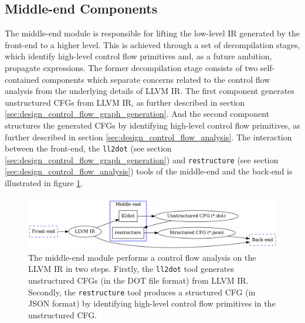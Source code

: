 


\subsection{Middle-end Components}
\label{sec:middle-end_components}

The middle-end module is responsible for lifting the low-level IR generated by the front-end to a higher level. This is achieved through a set of decompilation stages, which identify high-level control flow primitives and, as a future ambition, propagate expressions. The former decompilation stage consists of two self-contained components which separate concerns related to the control flow analysis from the underlying details of LLVM IR. The first component generates unstructured CFGs from LLVM IR, as further described in section \ref{sec:design_control_flow_graph_generation}. And the second component structures the generated CFGs by identifying high-level control flow primitives, as further described in section \ref{sec:design_control_flow_analysis}. The interaction between the front-end, the \texttt{ll2dot} (see section \ref{sec:design_control_flow_graph_generation}) and \texttt{restructure} (see section \ref{sec:design_control_flow_analysis}) tools of the middle-end and the back-end is illustrated in figure \ref{fig:middle-end}.

\begin{figure}[htbp]
	\begin{center}
		\includegraphics[width=\textwidth]{inc/middle-end.png}
		\caption{The middle-end module performs a control flow analysis on the LLVM IR in two steps. Firstly, the \texttt{ll2dot} tool generates unstructured CFGs (in the DOT file format) from LLVM IR. Secondly, the \texttt{restructure} tool produces a structured CFG (in JSON format) by identifying high-level control flow primitives in the unstructured CFG.}
		\label{fig:middle-end}
	\end{center}
\end{figure}





